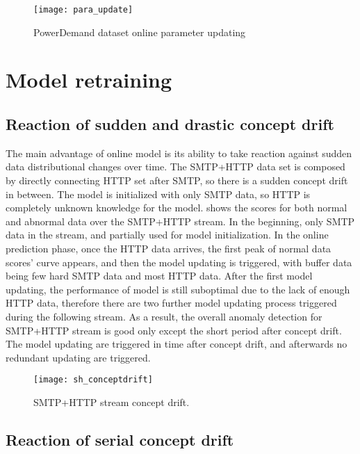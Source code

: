 \begin{figure}[h]
\centering
\texttt{[image: para\_update]}
\caption[PowerDemand dataset online parameter updating]{PowerDemand dataset online parameter updating}
\label{fig:parachanges}
\end{figure}



\section{Model retraining}
\label{sec:retraining}

\subsection{Reaction of sudden and drastic concept drift}
\label{sec:reaction}

The main advantage of online model is its ability to take reaction against sudden data distributional changes over time. The SMTP+HTTP data set is composed by directly connecting HTTP set after SMTP, so there is a sudden concept drift in between. The model is initialized with only SMTP data, so HTTP is completely unknown knowledge for the model.  shows the scores for both normal and abnormal data over the SMTP+HTTP stream. In the beginning, only SMTP data in the stream, and partially used for model initialization. In the online prediction phase, once the HTTP data arrives, the first peak of normal data scores’ curve appears, and then the model updating is triggered, with buffer data being few hard SMTP data and most HTTP data. After the first model updating, the performance of model is still suboptimal due to the lack of enough HTTP data, therefore there are two further model updating process triggered during the following stream. As a result, the overall anomaly detection for SMTP+HTTP stream is good only except the short period after concept drift. The model updating are triggered in time after concept drift, and afterwards no redundant updating are triggered.

\begin{figure}[h]
\centering
\texttt{[image: sh\_conceptdrift]}
\caption[SMTP+HTTP stream concept drift]{SMTP+HTTP stream concept drift.}
\label{fig:smtp+http}
\end{figure}

\subsection{Reaction of serial concept drift}
\label{sec:reaction}

